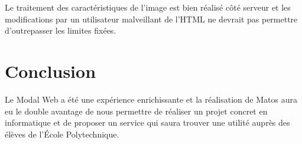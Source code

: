 \documentclass[titlepage,11pt,a4paper]{article}
\begin{document}
Le traitement des caractéristiques de l'image est bien réalisé côté serveur et les modifications par un utilisateur malveillant de l'HTML ne devrait pas permettre d'outrepasser les limites fixées.

\section{Conclusion}

Le Modal Web a été une expérience enrichissante et la réalisation de Matos aura eu le double avantage de nous permettre de réaliser un projet concret en informatique et de proposer un service qui saura trouver une utilité auprès des élèves de l'École Polytechnique.
\end{document}
